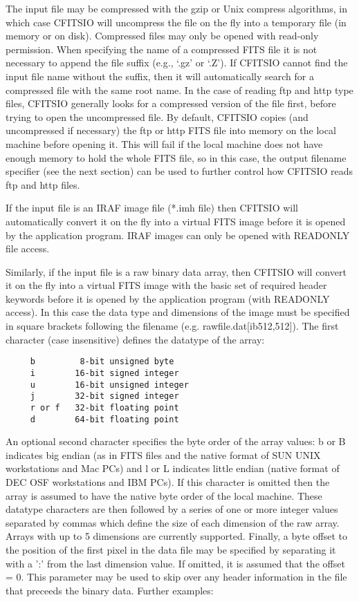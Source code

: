 \documentclass[11pt]{book}
\begin{document}
The input file may be compressed with the gzip or Unix compress
algorithms, in which case CFITSIO will uncompress the file on the fly
into a temporary file (in memory or on disk).  Compressed files may
only be opened with read-only permission.  When specifying the name of
a compressed FITS file it is not necessary to append the file suffix
(e.g., `.gz' or `.Z').  If CFITSIO cannot find the input file name
without the suffix, then it will automatically search for a compressed
file with the same root name.  In the case of reading ftp and http type
files, CFITSIO generally looks for a compressed version of the file
first, before trying to open the uncompressed file.  By default,
CFITSIO copies (and uncompressed if necessary) the ftp or http FITS
file into memory on the local machine before opening it.  This will
fail if the local machine does not have enough memory to hold the whole
FITS file, so in this case, the output filename specifier (see the next
section) can be used to further control how CFITSIO reads ftp and http
files.

If the input file is an IRAF image file (*.imh file) then CFITSIO will
automatically convert it on the fly into a virtual FITS image before it
is opened by the application program.  IRAF images can only be opened
with READONLY file access.

Similarly, if the input file is a raw binary data array, then CFITSIO
will convert it on the fly into a virtual FITS image with the basic set
of required header keywords before it is opened by the application
program (with READONLY access).  In this case the data type and
dimensions of the image must be specified in square brackets following
the filename (e.g. rawfile.dat[ib512,512]). The first character (case
insensitive) defines the datatype of the array:

\begin{verbatim}
     b         8-bit unsigned byte
     i        16-bit signed integer
     u        16-bit unsigned integer
     j        32-bit signed integer
     r or f   32-bit floating point
     d        64-bit floating point
\end{verbatim}
An optional second character specifies the byte order of the array
values: b or B indicates big endian (as in FITS files and the native
format of SUN UNIX workstations and Mac PCs) and l or L indicates
little endian (native format of DEC OSF workstations and IBM PCs).  If
this character is omitted then the array is assumed to have the native
byte order of the local machine.  These datatype characters are then
followed by a series of one or more integer values separated by commas
which define the size of each dimension of the raw array.  Arrays with
up to 5 dimensions are currently supported.  Finally, a byte offset to
the position of the first pixel in the data file may be specified by
separating it with a ':' from the last dimension value.  If omitted, it
is assumed that the offset = 0.  This parameter may be used to skip
over any header information in the file that preceeds the binary data.
Further examples:
\end{document}
